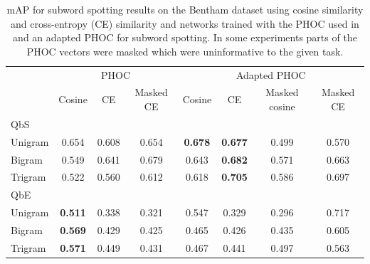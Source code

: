 \documentclass[ms,electronic,twosidetoc,letterpaper,chaptercenter,parttop,lof,lot]{byumsphd}
\begin{document}
\begin{table}
\centering
\begin{tabular}{| l | c c c | c c c c |}
  \hline
   & \multicolumn{3}{c|}{PHOC \cite{sudholt2017}} & \multicolumn{4}{c|}{Adapted PHOC}\\
   & Cosine & CE & Masked CE & Cosine & CE & Masked cosine & Masked CE   \\
  \hline   
  \hline 
  QbS & & & & & & & \\
  \hline
Unigram &  0.654 &  0.608 &  0.654 &  \textbf{0.678} &  \textbf{0.677} &  0.499 &  0.570 \\
Bigram  &  0.549 &  0.641 &  0.679 &  0.643 &  \textbf{0.682} &  0.571 &  0.663 \\
Trigram &  0.522 &  0.560 &  0.612 &  0.618 &  \textbf{0.705} &  0.586 &  0.697 \\
\hline


\hline 
  QbE & & & & & & & \\
  \hline
Unigram &  \textbf{0.511} &  0.338 & 0.321 &  0.547 &  0.329  &  0.296 &  0.717 \\
Bigram  &  \textbf{0.569} &  0.429 & 0.425 &  0.465 &  0.426  &  0.435 &  0.605 \\
Trigram &  \textbf{0.571} &  0.449 & 0.431 &  0.467 &  0.441  &  0.497 &  0.563 \\
\hline

\end{tabular}
\caption{mAP for subword spotting results on the Bentham dataset using cosine similarity and cross-entropy (CE) similarity and networks trained with the PHOC used in \cite{sudholt2017} and an adapted PHOC for subword spotting. In some experiments parts of the PHOC vectors were masked which were uninformative to the given task.}
\label{tab:distmetrics}
\end{table}
\end{document}
